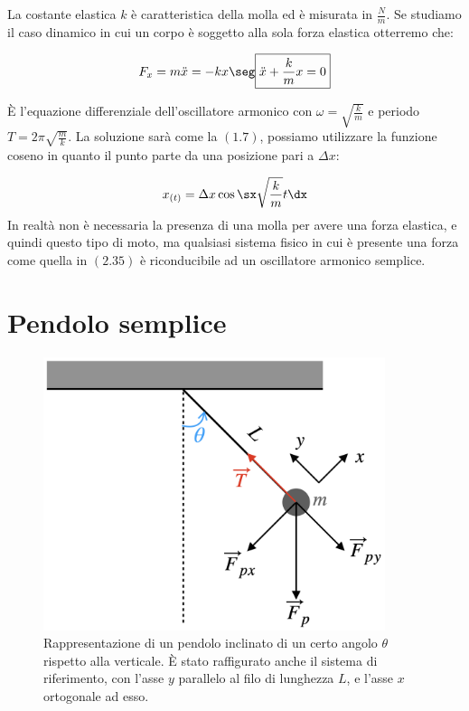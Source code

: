 La costante elastica $k$ è caratteristica della molla ed è misurata in $\frac Nm$. Se studiamo il caso dinamico in cui un corpo è soggetto alla sola forza elastica otterremo che:

\begin{equation}
F_x = m\ddot x = -kx \seg \boxed{\ddot x +\frac km x = 0}
\end{equation}

È l'equazione differenziale dell'oscillatore armonico con $\omega = \sqrt{\frac km}$ e periodo $T =2\pi\sqrt{\frac mk}$.
La soluzione sarà come la $(1.7)$, possiamo utilizzare la funzione coseno in quanto il punto parte da una posizione pari a $\Delta x$:

\begin{equation}
x_{(t)} = \Delta x \cos\sx \sqrt{\frac km}t\dx
\end{equation}
In realtà non è necessaria la presenza di una molla per avere una forza elastica, e quindi questo tipo di moto, ma qualsiasi sistema fisico in cui è presente una forza come quella in $(2.35)$ è riconducibile ad un oscillatore armonico semplice.




\section{Pendolo semplice}
\begin{figure}[htbp]
\begin{center}
\includegraphics[width=10cm]{images/pendolo.png}
\caption{Rappresentazione di un pendolo inclinato di un certo angolo $\theta$ rispetto alla verticale. È stato raffigurato anche il sistema di riferimento, con l'asse $y$ parallelo al filo di lunghezza $L$, e l'asse $x$ ortogonale ad esso.}
\label{default}
\end{center}
\end{figure}



